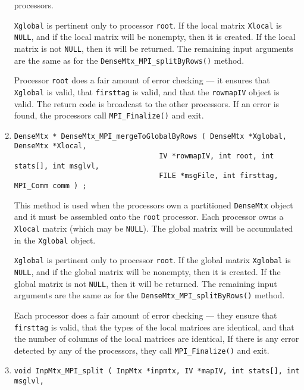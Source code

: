 \begin{enumerate}
processors.
\par
{\tt Xglobal} is pertinent only to processor {\tt root}.
If the local matrix {\tt Xlocal} is {\tt  NULL}, and if the local matrix
will be nonempty, then it is created.
If the local matrix is not {\tt NULL}, then it will be returned.
The remaining input arguments are the same as for the 
{\tt DenseMtx\_MPI\_splitByRows()} method.
\par {}
Processor {\tt root} does a fair amount of error checking --- it ensures
that {\tt Xglobal} is valid, that {\tt firsttag} is valid, and that the
{\tt rowmapIV} object is valid.
The return code is broadcast to the other processors.
If an error is found, the processors call {\tt MPI\_Finalize()} and
exit.
\item
\begin{verbatim}
DenseMtx * DenseMtx_MPI_mergeToGlobalByRows ( DenseMtx *Xglobal, DenseMtx *Xlocal, 
                                  IV *rowmapIV, int root, int stats[], int msglvl, 
                                  FILE *msgFile, int firsttag, MPI_Comm comm ) ;
\end{verbatim}
This method is used when the processors own a partitioned {\tt DenseMtx}
object and it must be assembled onto the {\tt root} processor.
Each processor owns a {\tt Xlocal} matrix (which may be {\tt NULL}).
The global matrix will be accumulated in the {\tt Xglobal} object.
\par
{\tt Xglobal} is pertinent only to processor {\tt root}.
If the global matrix {\tt Xglobal} is {\tt  NULL}, 
and if the global matrix will be nonempty, then it is created.
If the global matrix is not {\tt NULL}, then it will be returned.
The remaining input arguments are the same as for the 
{\tt DenseMtx\_MPI\_splitByRows()} method.
\par {}
Each processor does a fair amount of
error checking --- they ensure
that {\tt firsttag} is valid, 
that the types of the local matrices are identical,
and that the number of columns of the local matrices are identical,
If there is any error detected by any of the processors,
they call {\tt MPI\_Finalize()} and exit.
\item
\begin{verbatim}
void InpMtx_MPI_split ( InpMtx *inpmtx, IV *mapIV, int stats[], int msglvl, 

\end{verbatim}
\end{enumerate}
